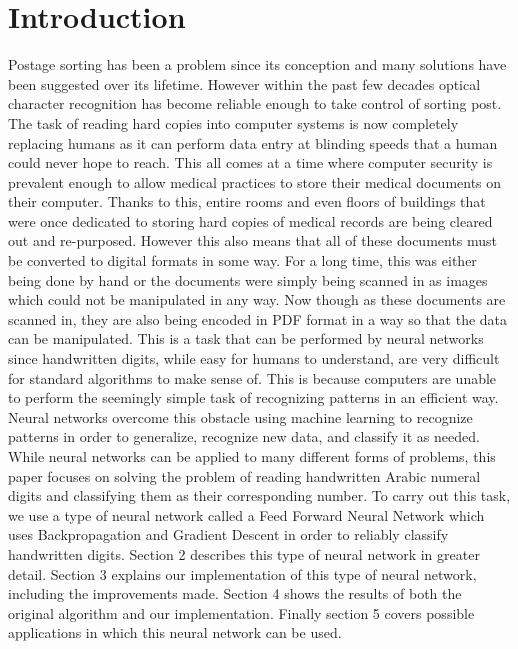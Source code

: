 \documentclass[12pt]{article}
\theoremstyle{definition}
\theoremstyle{plain}
\begin{document}
\section{Introduction}
Postage sorting has been a problem since its conception and many solutions have been suggested over its lifetime. However within the past few decades optical character recognition has become reliable enough to take control of sorting post. The task of reading hard copies into computer systems is now completely replacing humans as it can perform data entry at blinding speeds that a human could never hope to reach. This all comes at a time where computer security is prevalent enough to allow medical practices to store their medical documents on their computer. Thanks to this, entire rooms and even floors of buildings that were once dedicated to storing hard copies of medical records are being cleared out and re-purposed. However this also means that all of these documents must be converted to digital formats in some way. For a long time, this was either being done by hand or the documents were simply being scanned in as images which could not be manipulated in any way. Now though as these documents are scanned in, they are also being encoded in PDF format in a way so that the data can be manipulated. This is a task that can be performed by neural networks since handwritten digits, while easy for humans to understand, are very difficult for standard algorithms to make sense of. This is because computers are unable to perform the seemingly simple task of recognizing patterns in an efficient way. Neural networks overcome this obstacle using machine learning to recognize patterns in order to generalize, recognize new data, and classify it as needed. While neural networks can be applied to many different forms of problems, this paper focuses on solving the problem of reading handwritten Arabic numeral digits and classifying them as their corresponding number. To carry out this task, we use a type of neural network called a Feed Forward Neural Network which uses Backpropagation and Gradient Descent in order to reliably classify handwritten digits. Section 2 describes this type of neural network in greater detail. Section 3 explains our implementation of this type of neural network, including the improvements made. Section 4 shows the results of both the original algorithm and our implementation. Finally section 5 covers possible applications in which this neural network can be used.
\end{document}
